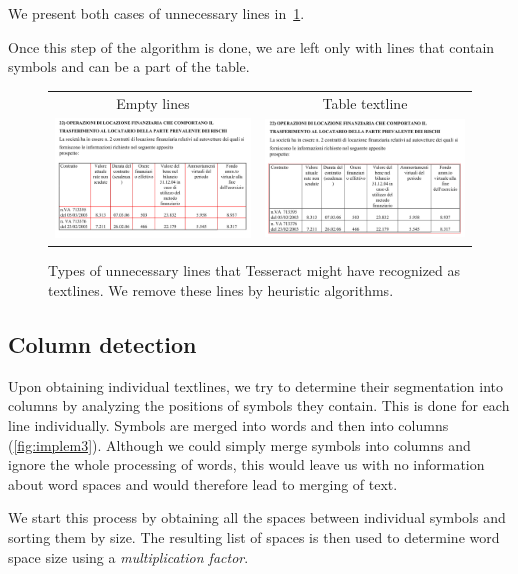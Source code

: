 We present both cases of unnecessary lines in~\cref{fig:deletionOfLines}.

Once this step of the algorithm is done, we are left only with lines that contain symbols and can be a part of the table.

\begin{figure}
\centering
{\sffamily
\begin{tabular}{cc}
Empty lines & Table textline \\
\includegraphics[width=0.4\linewidth]{img/implementation/textlineEmpty.png}
&
\includegraphics[width=0.4\linewidth]{img/implementation/textlineTable.png}\\
\end{tabular}
}
\caption{Types of unnecessary lines that Tesseract might have recognized as textlines. We remove these lines by heuristic algorithms.}
\label{fig:deletionOfLines}
\end{figure}

\subsection{Column detection} \label{columnDetection}

Upon obtaining individual textlines, we try to determine their segmentation into columns by analyzing the positions of symbols they contain. This is done for each line individually. Symbols are merged into words and then into columns (\cref{fig:implem3}). Although we could simply merge symbols into columns and ignore the whole processing of words, this would leave us with no information about word spaces and would therefore lead to merging of text.

We start this process by obtaining all the spaces between individual symbols and sorting them by size. The resulting list of spaces is then used to determine word space size using a \emph{multiplication factor}. 

